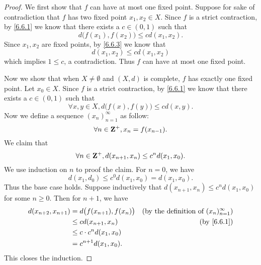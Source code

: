 \begin{proof}
  We first show that \(f\) can have at most one fixed point.
  Suppose for sake of contradiction that \(f\) has two fixed point \(x_1, x_2 \in X\).
  Since \(f\) is a strict contraction, by \cref{6.6.1} we know that there exists a \(c \in (0, 1)\) such that
  \[
    d\big(f(x_1), f(x_2)\big) \leq c d(x_1, x_2).
  \]
  Since \(x_1, x_2\) are fixed points, by \cref{6.6.3} we know that
  \[
    d(x_1, x_2) \leq c d(x_1, x_2)
  \]
  which implies \(1 \leq c\), a contradiction.
  Thus \(f\) can have at most one fixed point.

  Now we show that when \(X \neq \emptyset\) and \((X, d)\) is complete, \(f\) has exactly one fixed point.
  Let \(x_0 \in X\).
  Since \(f\) is a strict contraction, by \cref{6.6.1} we know that there exists a \(c \in (0, 1)\) such that
  \[
    \forall x, y \in X, d\big(f(x), f(y)\big) \leq c d(x, y).
  \]
  Now we define a sequence \((x_n)_{n = 1}^\infty\) as follow:
  \[
    \forall n \in \mathbf{Z}^+, x_n = f(x_{n - 1}).
  \]
  We claim that
  \[
    \forall n \in \mathbf{Z}^+, d(x_{n + 1}, x_n) \leq c^n d(x_1, x_0).
  \]
  We use induction on \(n\) to proof the claim.
  For \(n = 0\), we have
  \[
    d(x_1, d_0) \leq c^0 d(x_1, x_0) = d(x_1, x_0).
  \]
  Thus the base case holds.
  Suppose inductively that \(d(x_{n + 1}, x_n) \leq c^n d(x_1, x_0)\) for some \(n \geq 0\).
  Then for \(n + 1\), we have
  \begin{align*}
    d(x_{n + 2}, x_{n + 1}) & = d\big(f(x_{n + 1}), f(x_n)\big) & \text{(by the definition of \((x_n)_{n = 1}^\infty\))} \\
                            & \leq c d(x_{n + 1}, x_n)          & \text{(by \cref{6.6.1})}                               \\
                            & \leq c \cdot c^n d(x_1, x_0)                                                               \\
                            & = c^{n + 1} d(x_1, x_0).
  \end{align*}
  This closes the induction.


\end{proof}
